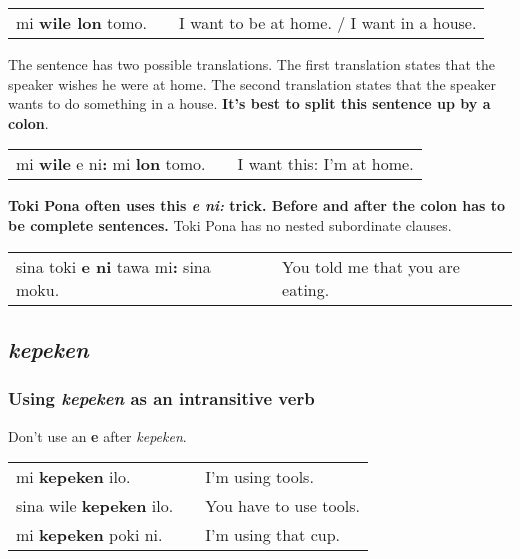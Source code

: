 \begin{supertabular}{p{5,5cm}|ll}
mi \textbf{wile lon} tomo. && I want to be at home. / I want in a house. \\
\end{supertabular} 

The sentence has two possible translations. 
The first translation states that the speaker wishes he were at home. 
The second translation states that the speaker wants to do something in a house. 
\textbf{It's best to split this sentence up by a colon}.

\begin{supertabular}{p{5,5cm}|ll}
mi \textbf{wile} e ni\textbf{:} mi \textbf{lon} tomo. && I want this: I'm at home. \\
\end{supertabular} 

\textbf{Toki Pona often uses this \textit{e ni:} trick. 
Before and after the colon has to be complete sentences. }
Toki Pona has no nested subordinate clauses.

\begin{supertabular}{p{5,5cm}|ll}
sina toki \textbf{e ni} tawa mi\textbf{:} sina moku. && You told me that you are eating. \\
\end{supertabular} 

{}
\subsection*{\textit{kepeken}}
%
\subsubsection*{Using \textit{kepeken} as an intransitive verb}

Don't use an \textbf{e} after \textit{kepeken}.
 
\begin{supertabular}{p{5,5cm}|ll}
mi \textbf{kepeken} ilo. && I'm using tools. \\
sina wile \textbf{kepeken} ilo. && You have to use tools. \\
mi \textbf{kepeken} poki ni. && I'm using that cup. \\
\end{supertabular} 
%
